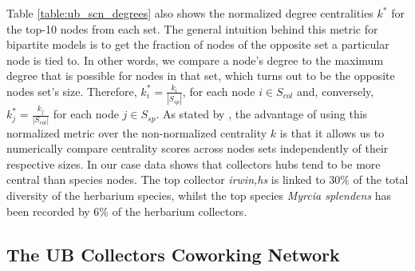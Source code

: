 Table \ref{table:ub_scn_degrees} also shows the normalized degree centralities $k^*$ for the top-10 nodes from each set. The general intuition behind this metric for bipartite models is to get the fraction of nodes of the opposite set a particular node is tied to. In other words, we compare a node's degree to the maximum degree that is possible for nodes in that set, which turns out to be the opposite nodes set's size. Therefore, $k^*_i = \frac{k_i}{|S_{sp}|}$, for each node $i \in S_{col}$ and, conversely, $k^*_j = \frac{k_j}{|S_{col}|}$ for each node $j \in S_{sp}$.  
As stated by \cite{Borgatti2015}, the advantage of using this normalized metric over the non-normalized centrality $k$ is that it allows us to numerically compare centrality scores across nodes sets independently of their respective sizes. 
In our case data shows that collectors hubs tend to be more central than species nodes. The top collector \textit{irwin,hs} is linked to $30\%$ of the total diversity of the herbarium species, whilst the top species \textit{Myrcia splendens} has been recorded by $6\%$ of the herbarium collectors. 


 







\subsection{The UB Collectors Coworking Network}


